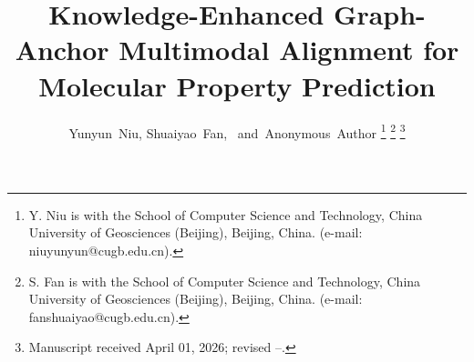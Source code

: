 \documentclass[journal]{IEEEtran}
\begin{document}
%
\title{Knowledge-Enhanced Graph-Anchor Multimodal Alignment for Molecular Property Prediction}
%
%
%

\author{Yunyun~Niu,
        Shuaiyao~Fan,~
        and~Anonymous~Author
\thanks{Y. Niu is with the School of Computer Science and Technology, China University of Geosciences (Beijing), Beijing, China. (e-mail: niuyunyun@cugb.edu.cn).}%
\thanks{S. Fan is with the School of Computer Science and Technology, China University of Geosciences (Beijing), Beijing, China. (e-mail: fanshuaiyao@cugb.edu.cn).}%
\thanks{Manuscript received April 01, 2026; revised --.}}

% 
%
\end{document}
